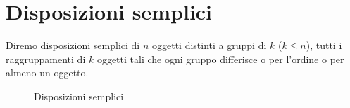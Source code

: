 \section{Disposizioni semplici}
\begin{defn}
Diremo disposizioni semplici di $n$ oggetti distinti a gruppi di $k$ ($ k\leqslant n$), tutti i raggruppamenti di $k$ oggetti tali che ogni gruppo differisce o per l'ordine o per almeno un oggetto.
\end{defn}
\begin{figure}
	\centering
	
	\caption{Disposizioni semplici}
	\label{fig:dispsemplici}
\end{figure}
